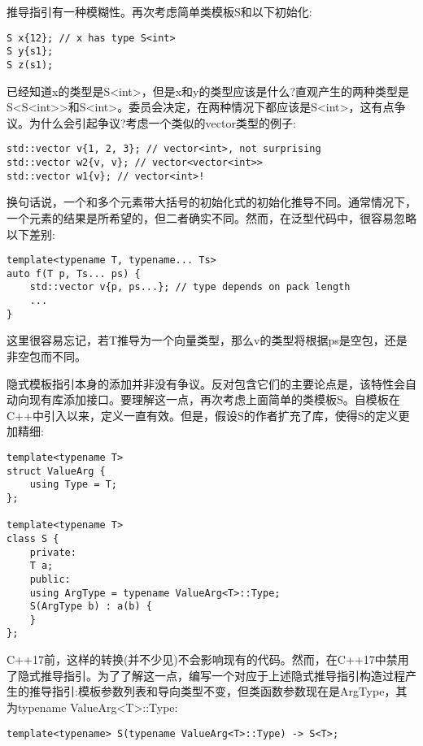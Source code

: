 推导指引有一种模糊性。再次考虑简单类模板S和以下初始化:

\begin{lstlisting}[style=styleCXX]
S x{12}; // x has type S<int>
S y{s1};
S z(s1);
\end{lstlisting}

已经知道x的类型是S<int>，但是x和y的类型应该是什么?直观产生的两种类型是S<S<int>>和S<int>。委员会决定，在两种情况下都应该是S<int>，这有点争议。为什么会引起争议?考虑一个类似的vector类型的例子:

\begin{lstlisting}[style=styleCXX]
std::vector v{1, 2, 3}; // vector<int>, not surprising
std::vector w2{v, v}; // vector<vector<int>>
std::vector w1{v}; // vector<int>!
\end{lstlisting}

换句话说，一个和多个元素带大括号的初始化式的初始化推导不同。通常情况下，一个元素的结果是所希望的，但二者确实不同。然而，在泛型代码中，很容易忽略以下差别:

\begin{lstlisting}[style=styleCXX]
template<typename T, typename... Ts>
auto f(T p, Ts... ps) {
	std::vector v{p, ps...}; // type depends on pack length
	...
}
\end{lstlisting}

这里很容易忘记，若T推导为一个向量类型，那么v的类型将根据ps是空包，还是非空包而不同。

隐式模板指引本身的添加并非没有争议。反对包含它们的主要论点是，该特性会自动向现有库添加接口。要理解这一点，再次考虑上面简单的类模板S。自模板在C++中引入以来，定义一直有效。但是，假设S的作者扩充了库，使得S的定义更加精细:

\begin{lstlisting}[style=styleCXX]
template<typename T>
struct ValueArg {
	using Type = T;
};

template<typename T>
class S {
	private:
	T a;
	public:
	using ArgType = typename ValueArg<T>::Type;
	S(ArgType b) : a(b) {
	}
};
\end{lstlisting}

C++17前，这样的转换(并不少见)不会影响现有的代码。然而，在C++17中禁用了隐式推导指引。为了了解这一点，编写一个对应于上述隐式推导指引构造过程产生的推导指引:模板参数列表和导向类型不变，但类函数参数现在是ArgType，其为typename ValueArg<T>::Type:

\begin{lstlisting}[style=styleCXX]
template<typename> S(typename ValueArg<T>::Type) -> S<T>;
\end{lstlisting}

